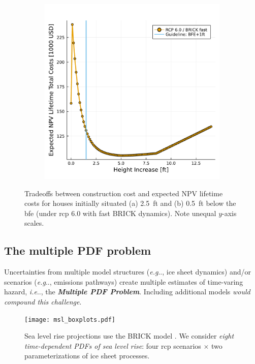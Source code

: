 \documentclass[12pt]{article}
\makeatletter
\DeclareRobustCommand\onedot{\futurelet\@let@token\@onedot}
\def\@onedot{\ifx\@let@token.\else.\null\fi\xspace}
\def\eg{\emph{e.g}\onedot} \def\Eg{\emph{E.g}\onedot}
\def\ie{\emph{i.e}\onedot} \def\Ie{\emph{I.e}\onedot}
\DeclareRobustCommand\onedot{\futurelet\@let@token\@onedot}
\def\@onedot{\ifx\@let@token.\else.\null\fi\xspace}
\def\eg{\emph{e.g}\onedot} \def\Eg{\emph{E.g}\onedot}
\def\ie{\emph{i.e}\onedot} \def\Ie{\emph{I.e}\onedot}
\makeatother
\begin{document}
\begin{figure}
\begin{subfigure}{0.3\textwidth}
        \includegraphics[width=\textwidth]{7.5.pdf}
    \end{subfigure}
    \caption{
        Tradeoffs between construction cost and expected NPV lifetime costs for houses initially situated (a) \SI{2.5}{ft} and (b) \SI{0.5}{ft} below the \gls{bfe} (under \gls{rcp} 6.0 with fast BRICK \citep{wong_brick0.2:2017} dynamics).
        Note unequal $y$-axis scales.
    }
\end{figure}

\subsection{The multiple PDF problem}

Uncertainties from multiple model structures (\eg, ice sheet dynamics) and/or scenarios (\eg, emissions pathways) create multiple estimates of time-varing hazard, \ie, the \textbf{\itshape{Multiple PDF Problem}}.
Including additional models \citep[\eg,][]{kopp_evolving:2017,deconto_antarctica:2016,ruckert_coastal:2019} \emph{would compound this challenge}.
\begin{figure}
    \centering
    \texttt{[image: msl\_boxplots.pdf]}
    \caption{
        Sea level rise projections use the BRICK model \citep{wong_brick0.2:2017,ruckert_coastal:2019}.
        We consider \emph{eight time-dependent PDFs of sea level rise}: four \gls{rcp} scenarios $\times$ two parameterizations of ice sheet processes.
    }\label{fig:boxplots}
\end{figure}
\end{document}
